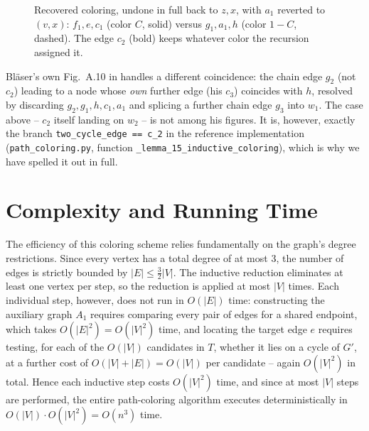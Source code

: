 \begin{figure}[H]
\centering
{}
\caption{Recovered coloring, undone in full back to $z,x$, with $a_1$ reverted
to $(v,x)$: $f_1,e,c_1$ (color $C$, solid) versus $g_1,a_1,h$ (color $1-C$,
dashed). The edge $c_2$ (bold) keeps whatever color the recursion assigned it.}
\end{figure}

Bl\"aser's own Fig.~A.10 in \cite{Blaser2004} handles a different coincidence:
the chain edge $g_2$ (not $c_2$) leading to a node whose \emph{own} further edge
(his $c_3$) coincides with $h$, resolved by discarding $g_2,g_1,h,c_1,a_1$ and
splicing a further chain edge $g_3$ into $w_1$. The case above -- $c_2$ itself
landing on $w_2$ -- is not among his figures. It is, however, exactly the branch
\texttt{two\_cycle\_edge == c\_2} in the reference implementation
(\texttt{path\_coloring.py}, function
\texttt{\_lemma\_15\_inductive\_coloring}), which is why we have spelled it out
in full.
\section{Complexity and Running Time}
The efficiency of this coloring scheme relies fundamentally on the graph's
degree restrictions. Since every vertex has a total degree of at most 3, the
number of edges is strictly bounded by $|E| \le \frac{3}{2}|V|$. The inductive
reduction eliminates at least one vertex per step, so the reduction is applied
at most $|V|$ times. Each individual step, however, does not run in $O(|E|)$
time: constructing the auxiliary graph $A_1$ requires comparing every pair of
edges for a shared endpoint, which takes $O(|E|^2) = O(|V|^2)$ time, and
locating the target edge $e$ requires testing, for each of the $O(|V|)$
candidates in $T$, whether it lies on a cycle of $G'$, at a further cost of
$O(|V|+|E|) = O(|V|)$ per candidate -- again $O(|V|^2)$ in total. Hence each
inductive step costs $O(|V|^2)$ time, and since at most $|V|$ steps are
performed, the entire path-coloring algorithm executes deterministically in
$O(|V|) \cdot O(|V|^2) = O(n^3)$ time.
